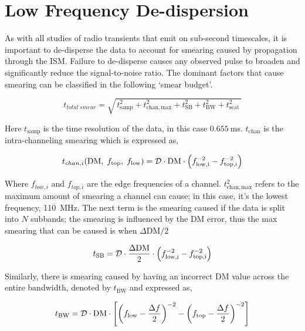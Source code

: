 \chapter{Low Frequency De-dispersion} \label{appen:low-frequency-dd}

As with all studies of radio transients that emit on sub-second timescales, it is important to de-disperse the data to account for smearing caused by propagation through the ISM. Failure to de-disperse causes any observed pulse to broaden and significantly reduce the signal-to-noise ratio. The dominant factors that cause smearing can be classified in the following `smear budget'.

\begin{equation}
    t_{total\; smear} = \sqrt{\,t_{\mathrm{samp}}^{2} + t_{\mathrm{chan,max}}^{2} + t_{\mathrm{SB}}^{2} + t_{\mathrm{BW}}^{2} + t_{\mathrm{scat}}^{2}\,}
    \label{eq:smear_budget}
\end{equation} 

Here $t_{\text{samp}}$ is the time resolution of the data, in this case $0.655~$ms. $t_{\text{chan}}$ is the intra-channeling smearing which is expressed as, 

\begin{equation}
    t_{chan,i} (\text{DM}, \; f_{\rm top}, \; f_{\rm low}) = \mathcal{D} \cdot \text{DM} \cdot \left( f^{-2}_{\rm low,i} - f^{-2}_{\rm top,i} \right)
\end{equation}

Where $f_{low,i}$ and $f_{top,i}$ are the edge frequencies of a channel. $t_{\mathrm{chan,max}}^{2}$ refers to the maximum amount of smearing a channel can cause; in this case, it's the lowest frequency, 110~MHz. The next term is the smearing caused if the data is split into $N$ subbands; the smearing is influenced by the DM error, thus the max smearing that can be caused is when $\Delta \text{DM}/2$

\begin{equation}
    t_{\rm SB} = \mathcal{D} \cdot  \frac{\Delta\text{DM}}{2} \cdot \left( f^{-2}_{\rm low,i} - f^{-2}_{\rm top,i} \right)
\end{equation}

Similarly, there is smearing caused by having an incorrect DM value across the entire bandwidth, denoted by $t_{\text{BW}}$ and expressed as, 

\begin{equation}
    t_{\rm BW} = \mathcal{D} \cdot \text{DM} \cdot \left[ \left(f_{\rm low} - \frac{\Delta f}{2}\right)^{-2} -\left(f_{\rm top} - \frac{\Delta f}{2}\right)^{-2}\right]
\end{equation}

